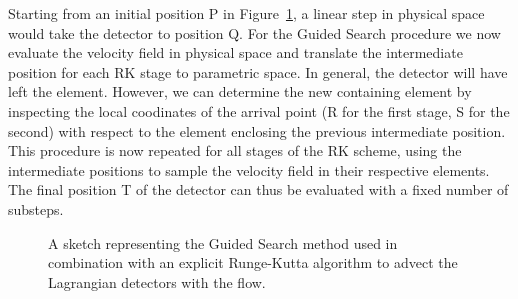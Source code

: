 Starting from an initial position P in Figure~\ref{fig:guided_search_menthod}, a linear step in physical space would take the detector to position Q. 
For the Guided Search procedure we now evaluate the velocity field in physical space and translate the intermediate position for each RK stage to parametric space.
In general, the detector will have left the element. However, we can determine the new containing element by inspecting the local coodinates of the arrival point 
(R for the first stage, S for the second) with respect to the element enclosing the previous intermediate position. 
This procedure is now repeated for all stages of the RK scheme, using the intermediate positions to sample the velocity field in their respective elements.
The final position T of the detector can thus be evaluated with a fixed number of substeps. 

\begin{figure}[ht]
  \centering
  \caption{A sketch representing the Guided Search method used in combination with an explicit Runge-Kutta algorithm to advect the Lagrangian detectors with the flow.}
  \label{fig:guided_search_menthod}
\end{figure}


